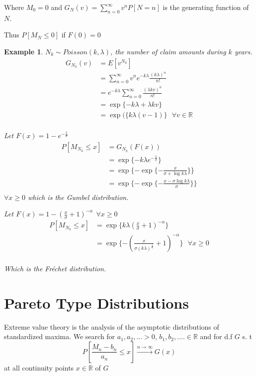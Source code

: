 \documentclass[11pt,a4paper,oneside]{article}
\newtheorem{exm}{Example}[subsection]
\begin{document}
Where $M_0=0$ and $G_N(v)=\displaystyle\sum_{n=0}^{\infty}v^nP[N=n]$ is the generating function of $N$.

Thus $P[M_N\leq 0]$ if $F(0)=0$

\begin{exm}$N_k\sim Poisson(k,\lambda)$, the number of claim amounts during $k$ years.
\begin{align*}
G_{N_k}(v)&=E[v^{N_k}]\\
&=\displaystyle\sum_{n=0}^{\infty}v^ne^{-k\lambda}\frac{(k\lambda)^n}{n!}\\
&=e^{-k\lambda}\displaystyle\sum_{n=0}^{\infty}\frac{(\lambda kv)^n}{n!}\\
&=\exp\{-k\lambda+\lambda k v\}\\
&=\exp(\{k\lambda(v-1)\}\ \ \ \forall v\in\mathbb{R}\\
\end{align*}

Let $F(x)=1-e^{-\frac{x}{\sigma}}$
\begin{align*}
P[M_{N_k}\leq x]&=G_{N_k}(F(x))\\
&=\exp\{-k\lambda e^{-\frac{x}{\sigma}}\}\\
&=\exp\{-\exp\{-\frac{x}{\sigma+\log k\lambda}\}\}\\
&=\exp\{-\exp\{-\frac{x-\sigma \log  k\lambda}{\sigma}\}\}\\
\end{align*}
$\forall x\geq 0$ which is the Gumbel distribution.

Let $F(x)=1-(\frac{x}{\sigma}+1)^{-\alpha}\ \ \forall x\geq 0$
\begin{align*}
P[M_{N_k}\leq x]&=\exp\{k\lambda(\frac{x}{\sigma}+1)^{-\alpha}\}\\
&=\exp\{-(\frac{x}{\sigma(k\lambda)^{\frac{1}{\alpha}}}+1)^{-\alpha}\}\ \ \ \forall x \geq 0\\
\end{align*}

Which is the Fréchet distribution.
\end{exm}
\section{Pareto Type Distributions}
Extreme value theory is the analysis of the asymptotic distributions of standardized maxima.
We search for $a_1,a_2,...>0$, $b_1,b_2,....\in\mathbb{R}$ and for d.f $G$ s. t
$$P\left[\frac{M_n-b_n}{a_n}\leq x\right]\xrightarrow{n\rightarrow\infty}G(x)$$
at all continuity points $x\in\mathbb{R}$ of $G$
\end{document}
